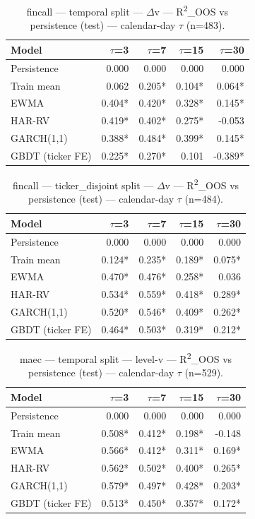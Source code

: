 \begin{table}[t]
\centering
\begin{tabular}{lrrrr}
\toprule
Model & $\tau$=3 & $\tau$=7 & $\tau$=15 & $\tau$=30 \\
\midrule
Persistence & 0.000 & 0.000 & 0.000 & 0.000 \\
Train mean & 0.062 & 0.205* & 0.104* & 0.064* \\
EWMA & 0.404* & 0.420* & 0.328* & 0.145* \\
HAR-RV & 0.419* & 0.402* & 0.275* & -0.053 \\
GARCH(1,1) & 0.388* & 0.484* & 0.399* & 0.145* \\
GBDT (ticker FE) & 0.225* & 0.270* & 0.101 & -0.389* \\
\bottomrule
\end{tabular}
\caption{fincall — temporal split — $\Delta$v — R\textsuperscript{2}\_OOS vs persistence (test) — calendar-day $\tau$ (n=483).}
\end{table}

\begin{table}[t]
\centering
\begin{tabular}{lrrrr}
\toprule
Model & $\tau$=3 & $\tau$=7 & $\tau$=15 & $\tau$=30 \\
\midrule
Persistence & 0.000 & 0.000 & 0.000 & 0.000 \\
Train mean & 0.124* & 0.235* & 0.189* & 0.075* \\
EWMA & 0.470* & 0.476* & 0.258* & 0.036 \\
HAR-RV & 0.534* & 0.559* & 0.418* & 0.289* \\
GARCH(1,1) & 0.520* & 0.546* & 0.409* & 0.262* \\
GBDT (ticker FE) & 0.464* & 0.503* & 0.319* & 0.212* \\
\bottomrule
\end{tabular}
\caption{fincall — ticker\_disjoint split — $\Delta$v — R\textsuperscript{2}\_OOS vs persistence (test) — calendar-day $\tau$ (n=484).}
\end{table}

\begin{table}[t]
\centering
\begin{tabular}{lrrrr}
\toprule
Model & $\tau$=3 & $\tau$=7 & $\tau$=15 & $\tau$=30 \\
\midrule
Persistence & 0.000 & 0.000 & 0.000 & 0.000 \\
Train mean & 0.508* & 0.412* & 0.198* & -0.148 \\
EWMA & 0.566* & 0.412* & 0.311* & 0.169* \\
HAR-RV & 0.562* & 0.502* & 0.400* & 0.265* \\
GARCH(1,1) & 0.579* & 0.497* & 0.428* & 0.203* \\
GBDT (ticker FE) & 0.513* & 0.450* & 0.357* & 0.172* \\
\bottomrule
\end{tabular}
\caption{maec — temporal split — level-v — R\textsuperscript{2}\_OOS vs persistence (test) — calendar-day $\tau$ (n=529).}
\end{table}

